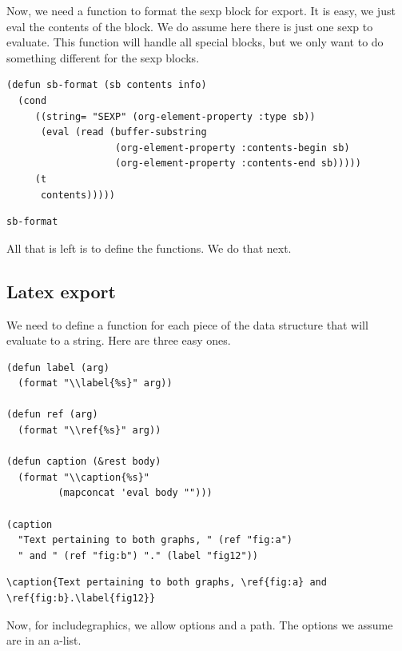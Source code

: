 \documentclass[11pt]{article}
\begin{document}
Now, we need a function to format the sexp block for export. It is easy, we just eval the contents of the block. We do assume here there is just one sexp to evaluate. This function will handle all special blocks, but we only want to do something different for the sexp blocks.

\begin{verbatim}
(defun sb-format (sb contents info)
  (cond
     ((string= "SEXP" (org-element-property :type sb))
      (eval (read (buffer-substring
                   (org-element-property :contents-begin sb)
                   (org-element-property :contents-end sb)))))
     (t
      contents)))))
\end{verbatim}

\begin{verbatim}
sb-format
\end{verbatim}

All that is left is to define the functions. We do that next.

\subsection{Latex export}
\label{sec-1-1}

We need to define a function for each piece of the data structure that will evaluate to a string. Here are three easy ones.

\begin{verbatim}
(defun label (arg)
  (format "\\label{%s}" arg))

(defun ref (arg)
  (format "\\ref{%s}" arg))

(defun caption (&rest body)
  (format "\\caption{%s}"
         (mapconcat 'eval body "")))

(caption
  "Text pertaining to both graphs, " (ref "fig:a")
  " and " (ref "fig:b") "." (label "fig12"))
\end{verbatim}
\begin{verbatim}
\caption{Text pertaining to both graphs, \ref{fig:a} and \ref{fig:b}.\label{fig12}}
\end{verbatim}

Now, for includegraphics, we allow options and a path. The options we assume are in an a-list.
\end{document}
